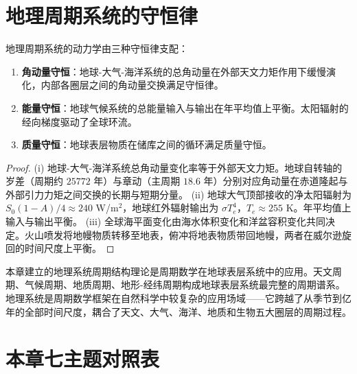 \section{地理周期系统的守恒律}
\label{sec:geo_conservation}

\begin{theorem}[地理系统的三种守恒律]\label{thm:geographic_conservation_laws}
地理周期系统的动力学由三种守恒律支配：
\begin{enumerate}[label=(\roman*)]
    \item \textbf{角动量守恒}：地球-大气-海洋系统的总角动量在外部天文力矩作用下缓慢演化，内部各圈层之间的角动量交换满足守恒律。
    \item \textbf{能量守恒}：地球气候系统的总能量输入与输出在年平均值上平衡。太阳辐射的经向梯度驱动了全球环流。
    \item \textbf{质量守恒}：地球表层物质在储库之间的循环满足质量守恒。
\end{enumerate}
\end{theorem}

\begin{proof}
(i) 地球-大气-海洋系统总角动量变化率等于外部天文力矩。地球自转轴的岁差（周期约 $25772$ 年）与章动（主周期 $18.6$ 年）分别对应角动量在赤道隆起与外部引力力矩之间交换的长期与短期分量。
(ii) 地球大气顶部接收的净太阳辐射为 $S_0(1-A)/4\approx 240$ W/m$^2$，地球红外辐射输出为 $\sigma T_e^4$，$T_e\approx 255$ K。年平均值上输入与输出平衡。
(iii) 全球海平面变化由海水体积变化和洋盆容积变化共同决定。火山喷发将地幔物质转移至地表，俯冲将地表物质带回地幔，两者在威尔逊旋回的时间尺度上平衡。
\end{proof}

\begin{remark}[与全书的衔接]\label{rem:geo_book_interface}
本章建立的地理系统周期结构理论是周期数学在地球表层系统中的应用。天文周期、气候周期、地质周期、地形-经纬周期构成地球表层系统最完整的周期谱系。地理系统是周期数学框架在自然科学中较复杂的应用场域——它跨越了从季节到亿年的全部时间尺度，耦合了天文、大气、海洋、地质和生物五大圈层的周期过程。
\end{remark}

\section*{本章七主题对照表}

